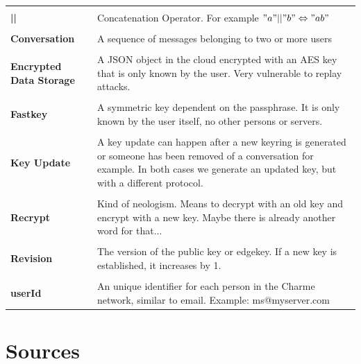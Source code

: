 \documentclass{scrartcl}
\begin{document}
\begin{tabular}{p{4cm} p{10cm} }
          &  \\
\textbf{||} &  Concatenation Operator. For example $"a" || "b" \Leftrightarrow "ab" $ \\\\
\textbf{Conversation} & A sequence of messages belonging to two or more users  \\\\

\textbf{Encrypted Data Storage} & A JSON object in the cloud encrypted with an AES key that is only known by the user. Very vulnerable to replay attacks. \\\\

\textbf{Fastkey} & A symmetric key dependent on the passphrase. It is only known by the user itself, no other persons or servers. \\\\

\textbf{Key Update} &
A key update can happen after a new keyring is generated or someone has been removed of a conversation for example. In both cases we generate an updated key, but with a different protocol. \\\\


\textbf{Recrypt} &
Kind of neologism. Means to decrypt with an old key and encrypt with a new key. Maybe there is already another word for that...\\\\

\textbf{Revision} &
The version of the public key or edgekey. If a new key is established, it increases by 1.\\\\

\textbf{userId} &  An unique identifier for each person in the Charme network, similar to email. Example: ms@myserver.com
\end{tabular}


\clearpage
\section{Sources}
\printbibliography




  
\end{document}
